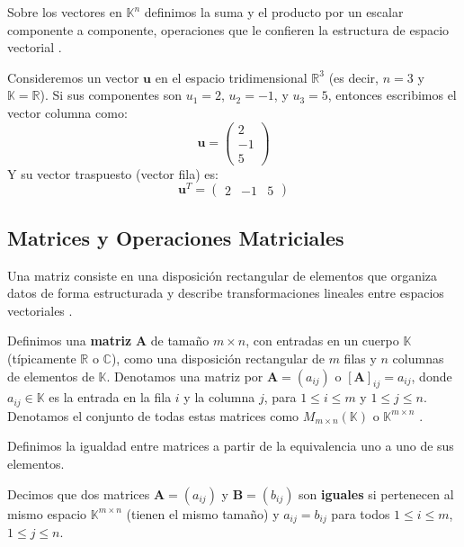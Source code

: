 Sobre los vectores en $\mathbb{K}^n$ definimos la suma y el producto por un escalar componente a componente, operaciones que le confieren la estructura de espacio vectorial \citep{Noble1988}.

\begin{example}

Consideremos un vector $\mathbf{u}$ en el espacio tridimensional $\mathbb{R}^3$ (es decir, $n=3$ y $\mathbb{K}=\mathbb{R}$). Si sus componentes son $u_1 = 2$, $u_2 = -1$, y $u_3 = 5$, entonces escribimos el vector columna como:
\[ \mathbf{u} = \begin{pmatrix} 2 \\ -1 \\ 5 \end{pmatrix} \]
Y su vector traspuesto (vector fila) es:
\[ \mathbf{u}^T = \begin{pmatrix} 2 & -1 & 5 \end{pmatrix} \]

\end{example}

\subsection{Matrices y Operaciones Matriciales}
\label{subsec:matrices_operations}

Una matriz consiste en una disposición rectangular de elementos que organiza datos de forma estructurada y describe transformaciones lineales entre espacios vectoriales \citep{Strang2016}.

\begin{definition}[Matriz]
\label{def:matrix_general}
Definimos una \textbf{matriz} $\mathbf{A}$ de tamaño $m \times n$, con entradas en un cuerpo $\mathbb{K}$ (típicamente $\mathbb{R}$ o $\mathbb{C}$), como una disposición rectangular de $m$ filas y $n$ columnas de elementos de $\mathbb{K}$. Denotamos una matriz por $\mathbf{A} = (a_{ij})$ o $[\mathbf{A}]_{ij} = a_{ij}$, donde $a_{ij} \in \mathbb{K}$ es la entrada en la fila $i$ y la columna $j$, para $1 \leq i \leq m$ y $1 \leq j \leq n$. Denotamos el conjunto de todas estas matrices como $M_{m \times n}(\mathbb{K})$ o $\mathbb{K}^{m \times n}$ \citep{Bishop2006}.
\end{definition}

Definimos la igualdad entre matrices a partir de la equivalencia uno a uno de sus elementos.

\begin{definition}
\label{def:matrix_equality_general}
Decimos que dos matrices $\mathbf{A} = (a_{ij})$ y $\mathbf{B} = (b_{ij})$ son \textbf{iguales} si pertenecen al mismo espacio $\mathbb{K}^{m \times n}$ (tienen el mismo tamaño) y $a_{ij} = b_{ij}$ para todos $1 \leq i \leq m$, $1 \leq j \leq n$.
\end{definition}


